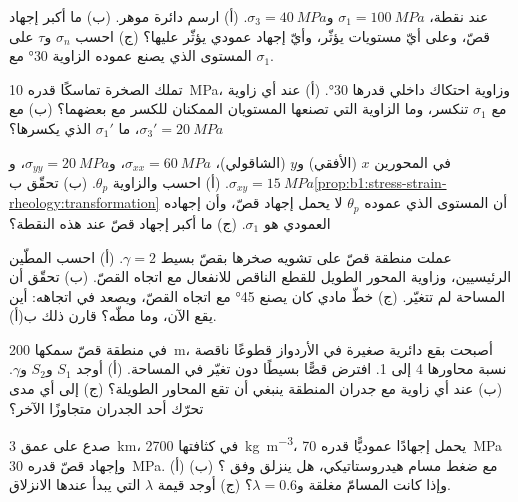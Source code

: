 \begin{exercise}[$\star$]\label{exo:b1:stress-strain-rheology:3}
عند نقطة، $\sigma_1 = \qty{100}{MPa}$ و$\sigma_3 = \qty{40}{MPa}$. (أ) ارسم دائرة موهر. (ب) ما أكبر إجهاد قصّ، وعلى أيّ مستويات يؤثّر، وأيّ إجهاد عمودي يؤثّر عليها؟ (ج) احسب $\sigma_n$ و$\tau$ على المستوى الذي يصنع عموده الزاوية \ang{30} مع $\sigma_1$.
\end{exercise}

\begin{exercise}[$\star$]\label{exo:b1:stress-strain-rheology:4}
تملك الصخرة تماسكًا قدره \qty{10}{MPa}، وزاوية احتكاك داخلي قدرها \ang{30}. (أ) عند أي زاوية مع $\sigma_1$ تنكسر، وما الزاوية التي تصنعها المستويان الممكنان للكسر مع بعضهما؟ (ب) مع $\sigma_3' = \qty{20}{MPa}$، ما  $\sigma_1'$ الذي يكسرها؟
\end{exercise}

\begin{exercise}[$\star\star$]\label{exo:b1:stress-strain-rheology:5}
في المحورين $x$ (الأفقي) و$y$ (الشاقولي)، $\sigma_{xx} = \qty{60}{MPa}$، و$\sigma_{yy} = \qty{20}{MPa}$، و$\sigma_{xy} = \qty{15}{MPa}$. (أ) احسب  والزاوية $\theta_p$. (ب) تحقّق ب\cref{prop:b1:stress-strain-rheology:transformation} أن المستوى الذي عموده $\theta_p$ لا يحمل إجهاد قصّ، وأن إجهاده العمودي هو $\sigma_1$. (ج) ما أكبر إجهاد قصّ عند هذه النقطة؟
\end{exercise}

\begin{exercise}[$\star\star$]\label{exo:b1:stress-strain-rheology:6}
عملت منطقة قصّ على تشويه صخرها بقصّ بسيط $\gamma = 2$. (أ) احسب المطّين الرئيسيين، وزاوية المحور الطويل للقطع الناقص للانفعال مع اتجاه القصّ. (ب) تحقّق أن المساحة لم تتغيّر. (ج) خطّ مادي كان يصنع \ang{45} مع اتجاه القصّ، ويصعد في اتجاهه: أين يقع الآن، وما مطّه؟ قارن ذلك ب(أ).
\end{exercise}

\begin{exercise}[$\star\star$]\label{exo:b1:stress-strain-rheology:7}
في منطقة قصّ سمكها \qty{200}{m}، أصبحت بقع دائرية صغيرة في الأردواز قطوعًا ناقصة نسبة محاورها 4 إلى 1. افترض قصًّا بسيطًا دون تغيّر في المساحة. (أ) أوجد $S_1$ و$S_2$ و$\gamma$. (ب) عند أي زاوية مع جدران المنطقة ينبغي أن تقع المحاور الطويلة؟ (ج) إلى أي مدى تحرّك أحد الجدران متجاوزًا الآخر؟
\end{exercise}

\begin{exercise}[$\star\star$]\label{exo:b1:stress-strain-rheology:8}
صدع على عمق \qty{3}{km}، في  كثافتها \qty{2700}{kg.m^{-3}}، يحمل إجهادًا عموديًّا قدره \qty{70}{MPa} وإجهاد قصّ قدره \qty{30}{MPa}. (أ) مع ضغط مسام هيدروستاتيكي، هل ينزلق وفق ؟ (ب) وإذا كانت المسامّ مغلقة و$\lambda = 0.6$؟ (ج) أوجد قيمة $\lambda$ التي يبدأ عندها الانزلاق.
\end{exercise}


